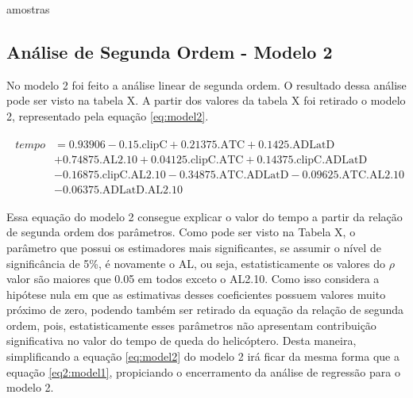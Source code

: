 amostras
\subsection{Análise de Segunda Ordem - Modelo 2}

No modelo 2 foi feito a análise linear de segunda ordem. O resultado dessa análise pode ser visto na tabela X. A partir dos valores da tabela X foi retirado o modelo 2, representado pela equação \ref{eq:model2}.


\begin{align}
    \begin{split}
    tempo &= 0.93906 - 0.15\text{.clipC} + 0.21375\text{.ATC} + 0.1425\text{.ADLatD}  \\
    & + 0.74875\text{.AL2.10} + 0.04125\text{.clipC.ATC} + 0.14375\text{.clipC.ADLatD} \\
    & - 0.16875\text{.clipC.AL2.10} - 0.34875\text{.ATC.ADLatD} - 0.09625\text{.ATC.AL2.10} \\
    & - 0.06375\text{.ADLatD.AL2.10}
    \end{split}
\label{eq:model2}
\end{align}

Essa equação do modelo 2 consegue explicar o valor do tempo a partir da relação de segunda ordem dos parâmetros. Como pode ser visto na Tabela X, o parâmetro que possui os estimadores mais significantes, se assumir o nível de significância de 5\%, é novamente o AL, ou seja, estatisticamente os valores do $\rho$ valor são maiores que 0.05 em todos exceto o AL2.10. Como isso considera a hipótese nula em que as estimativas desses coeficientes possuem valores muito próximo de zero, podendo também ser retirado da equação da relação de segunda ordem, pois, estatisticamente esses parâmetros não apresentam contribuição significativa no valor do tempo de queda do helicóptero. Desta maneira, simplificando a equação \ref{eq:model2} do modelo 2 irá ficar da mesma forma que a equação \ref{eq2:model1}, propiciando o encerramento da análise de regressão para o modelo 2.







